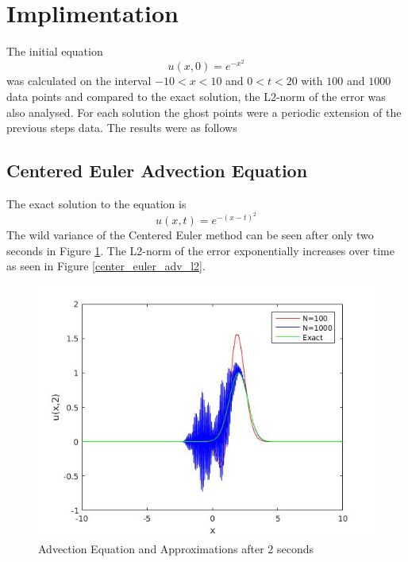 \section{Implimentation}
The initial equation
\begin{equation}
  u(x,0) = e^{-x^2}
\end{equation}
was calculated on the interval $-10<x<10$ and $0<t<20$ with $100$ and $1000$ data points and compared to the exact solution, the L2-norm of the error was also analysed. For each solution the ghost points were a periodic extension of the previous steps data. The results were as follows
\subsection{Centered Euler Advection Equation}
The exact solution to the equation is
\begin{equation}
u(x,t) = e^{-(x-t)^2}
\end{equation}
The wild variance of the Centered Euler method can be seen after only two seconds in Figure \ref{center_euler_adv}. The L2-norm of the error exponentially increases over time as seen in Figure \ref{center_euler_adv_l2}.
\begin{figure}[H] 
 \includegraphics[scale=0.5]{Images/center_euler_adv.jpg}
 \caption{Advection Equation and Approximations after 2 seconds}
 \label{center_euler_adv}
\end{figure}
